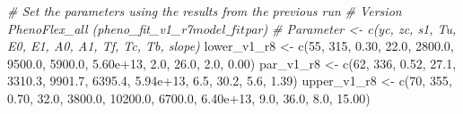 \documentclass[
]{article}
\newenvironment{Shaded}{\begin{snugshade}}{\end{snugshade}}
\newcommand{\CommentTok}[1]{\textcolor[rgb]{0.56,0.35,0.01}{\textit{#1}}}
\newcommand{\DecValTok}[1]{\textcolor[rgb]{0.00,0.00,0.81}{#1}}
\newcommand{\FloatTok}[1]{\textcolor[rgb]{0.00,0.00,0.81}{#1}}
\newcommand{\FunctionTok}[1]{\textcolor[rgb]{0.00,0.00,0.00}{#1}}
\newcommand{\NormalTok}[1]{#1}
\newcommand{\OtherTok}[1]{\textcolor[rgb]{0.56,0.35,0.01}{#1}}
\begin{document}
\begin{Shaded}
\begin{Highlighting}[]
\CommentTok{\# Set the parameters using the results from the previous run}
\CommentTok{\# Version PhenoFlex\_all (pheno\_fit\_v1\_r7$model\_fit$par)}
\CommentTok{\# Parameter \textless{}{-} c(yc,  zc,   s1,   Tu,     E0,      E1,     A0,       A1,   Tf,   Tc,   Tb, slope)}
\NormalTok{lower\_v1\_r8 }\OtherTok{\textless{}{-}} \FunctionTok{c}\NormalTok{(}\DecValTok{55}\NormalTok{, }\DecValTok{315}\NormalTok{, }\FloatTok{0.30}\NormalTok{, }\FloatTok{22.0}\NormalTok{, }\FloatTok{2800.0}\NormalTok{,  }\FloatTok{9500.0}\NormalTok{, }\FloatTok{5900.0}\NormalTok{, }\FloatTok{5.60e+13}\NormalTok{,  }\FloatTok{2.0}\NormalTok{, }\FloatTok{26.0}\NormalTok{,  }\FloatTok{2.0}\NormalTok{,  }\FloatTok{0.00}\NormalTok{)}
\NormalTok{par\_v1\_r8   }\OtherTok{\textless{}{-}} \FunctionTok{c}\NormalTok{(}\DecValTok{62}\NormalTok{, }\DecValTok{336}\NormalTok{, }\FloatTok{0.52}\NormalTok{, }\FloatTok{27.1}\NormalTok{, }\FloatTok{3310.3}\NormalTok{,  }\FloatTok{9901.7}\NormalTok{, }\FloatTok{6395.4}\NormalTok{, }\FloatTok{5.94e+13}\NormalTok{,  }\FloatTok{6.5}\NormalTok{, }\FloatTok{30.2}\NormalTok{,  }\FloatTok{5.6}\NormalTok{,  }\FloatTok{1.39}\NormalTok{)}
\NormalTok{upper\_v1\_r8 }\OtherTok{\textless{}{-}} \FunctionTok{c}\NormalTok{(}\DecValTok{70}\NormalTok{, }\DecValTok{355}\NormalTok{, }\FloatTok{0.70}\NormalTok{, }\FloatTok{32.0}\NormalTok{, }\FloatTok{3800.0}\NormalTok{, }\FloatTok{10200.0}\NormalTok{, }\FloatTok{6700.0}\NormalTok{, }\FloatTok{6.40e+13}\NormalTok{,  }\FloatTok{9.0}\NormalTok{, }\FloatTok{36.0}\NormalTok{,  }\FloatTok{8.0}\NormalTok{, }\FloatTok{15.00}\NormalTok{)}



\end{Highlighting}
\end{Shaded}
\end{document}
